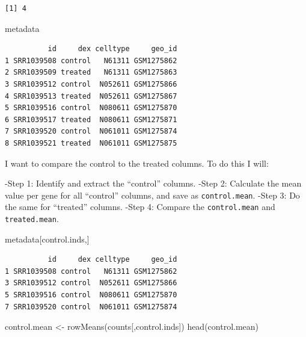 \documentclass[
  letterpaper,
  DIV=11,
  numbers=noendperiod]{scrartcl}
\newenvironment{Shaded}{\begin{snugshade}}{\end{snugshade}}
\newcommand{\FunctionTok}[1]{\textcolor[rgb]{0.28,0.35,0.67}{#1}}
\newcommand{\NormalTok}[1]{\textcolor[rgb]{0.00,0.23,0.31}{#1}}
\newcommand{\OtherTok}[1]{\textcolor[rgb]{0.00,0.23,0.31}{#1}}
\newcommand{\SpecialCharTok}[1]{\textcolor[rgb]{0.37,0.37,0.37}{#1}}
\newcommand{\StringTok}[1]{\textcolor[rgb]{0.13,0.47,0.30}{#1}}
\begin{document}
\begin{verbatim}
[1] 4
\end{verbatim}

\begin{Shaded}
\begin{Highlighting}[]
\NormalTok{metadata}
\end{Highlighting}
\end{Shaded}

\begin{verbatim}
          id     dex celltype     geo_id
1 SRR1039508 control   N61311 GSM1275862
2 SRR1039509 treated   N61311 GSM1275863
3 SRR1039512 control  N052611 GSM1275866
4 SRR1039513 treated  N052611 GSM1275867
5 SRR1039516 control  N080611 GSM1275870
6 SRR1039517 treated  N080611 GSM1275871
7 SRR1039520 control  N061011 GSM1275874
8 SRR1039521 treated  N061011 GSM1275875
\end{verbatim}

I want to compare the control to the treated columns. To do this I will:

-Step 1: Identify and extract the ``control'' columns. -Step 2:
Calculate the mean value per gene for all ``control'' columns, and save
as \texttt{control.mean}. -Step 3: Do the same for ``treated'' columns.
-Step 4: Compare the \texttt{control.mean} and \texttt{treated.mean}.

\begin{Shaded}
\end{Shaded}

\begin{Shaded}
\begin{Highlighting}[]
\NormalTok{metadata[control.inds,]}
\end{Highlighting}
\end{Shaded}

\begin{verbatim}
          id     dex celltype     geo_id
1 SRR1039508 control   N61311 GSM1275862
3 SRR1039512 control  N052611 GSM1275866
5 SRR1039516 control  N080611 GSM1275870
7 SRR1039520 control  N061011 GSM1275874
\end{verbatim}

\begin{Shaded}
\begin{Highlighting}[]
\NormalTok{control.mean }\OtherTok{\textless{}{-}} \FunctionTok{rowMeans}\NormalTok{(counts[,control.inds])}
\FunctionTok{head}\NormalTok{(control.mean)}
\end{Highlighting}
\end{Shaded}
\end{document}
